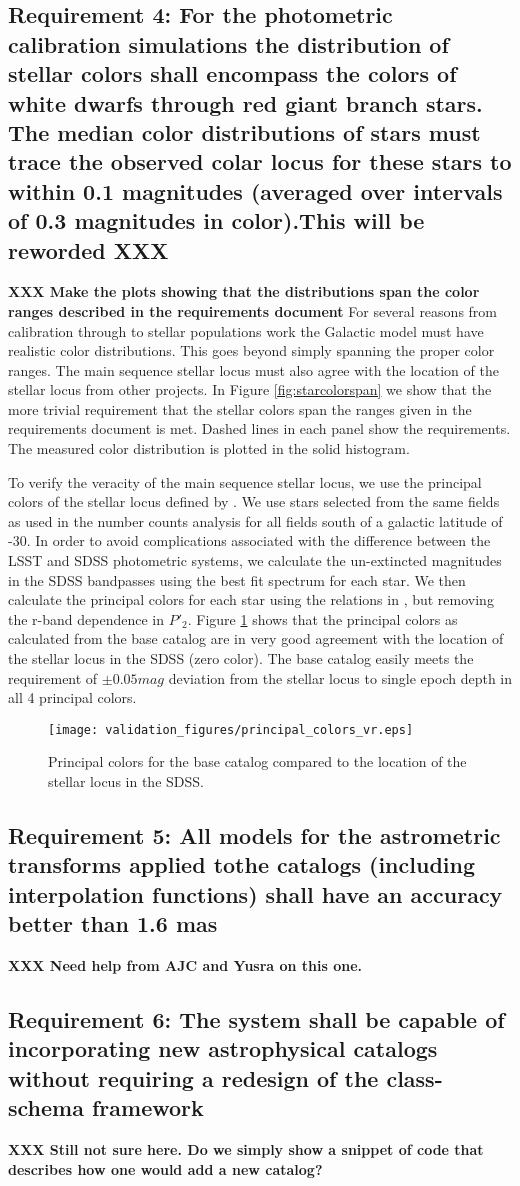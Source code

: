 \documentclass[]{article}
\begin{document}
\subsection{Requirement 4: For the photometric calibration simulations
the distribution of stellar colors shall encompass the colors of white dwarfs through red giant branch stars.
The median color distributions of stars must trace the observed colar locus for these stars to within 0.1 magnitudes
(averaged over intervals of 0.3 magnitudes in color).{\bf This will be reworded XXX}}
{\bf XXX Make the plots showing that the distributions span the color ranges described in the requirements document}
For several reasons from calibration through to stellar populations work the Galactic model must have realistic color distributions.
This goes beyond simply spanning the proper color ranges.  The main sequence stellar locus must also agree with the location of the
stellar locus from other projects.  In Figure \ref{fig:starcolorspan} we show that the more trivial requirement that the stellar
colors span the ranges given in the requirements document is met.  Dashed lines in each panel show the requirements.  The measured
color distribution is plotted in the solid histogram.

To verify the veracity of the main sequence stellar locus, we use the principal colors of the stellar locus defined by \cite{ivezic04}.
We use stars selected from the same fields as used in the number counts analysis for all fields south of a galactic latitude of -30.
In order to avoid complications associated with the difference between the LSST and SDSS photometric systems, we calculate the un-extincted 
magnitudes in the SDSS bandpasses using the best fit spectrum for each star.  We then calculate
the principal colors for each star using the relations in \cite{ivezic04}, but removing the r-band dependence in $P\prime_{2}$.  Figure
\ref{fig:principalcolors} shows that the principal colors as calculated from the base catalog are in very good agreement with
the location of the stellar locus in the SDSS (zero color).  The base catalog easily meets the requirement of $\pm0.05mag$ deviation
from the stellar locus to single epoch depth in all 4 principal colors.
\begin{figure}
\centering
\texttt{[image: validation\_figures/principal\_colors\_vr.eps]}
\caption{Principal colors for the base catalog compared to the location of the stellar locus in the SDSS.\label{fig:principalcolors}}
\end{figure}
\subsection{Requirement 5: All models for the astrometric transforms applied tothe catalogs (including interpolation functions) 
shall have an accuracy better than 1.6 mas}
{\bf XXX Need help from AJC and Yusra on this one.}
\subsection{Requirement 6: The system shall be capable of incorporating new astrophysical catalogs without requiring
a redesign of the class-schema framework}
{\bf XXX Still not sure here.  Do we simply show a snippet of code that describes how one would add a new catalog?}
\end{document}
